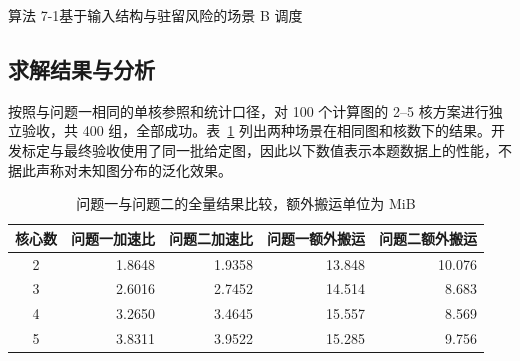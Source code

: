 \begin{algorithmblock}{算法 7-1\quad 基于输入结构与驻留风险的场景 B 调度}
\end{algorithmblock}

\subsection{求解结果与分析}
按照与问题一相同的单核参照和统计口径，对 100 个计算图的 2--5 核方案进行独立验收，共 400 组，全部成功。表~\ref{tab:q2-result} 列出两种场景在相同图和核数下的结果。开发标定与最终验收使用了同一批给定图，因此以下数值表示本题数据上的性能，不据此声称对未知图分布的泛化效果。

\begin{table}[htbp]
\centering
\caption{问题一与问题二的全量结果比较，额外搬运单位为 MiB}
\label{tab:q2-result}
\begin{tabular}{crrrr}
\hline
核心数 & 问题一加速比 & 问题二加速比 & 问题一额外搬运 & 问题二额外搬运 \\
\hline
2 & 1.8648 & 1.9358 & 13.848 & 10.076 \\
3 & 2.6016 & 2.7452 & 14.514 & 8.683 \\
4 & 3.2650 & 3.4645 & 15.557 & 8.569 \\
5 & 3.8311 & 3.9522 & 15.285 & 9.756 \\
\hline
\end{tabular}
\end{table}

